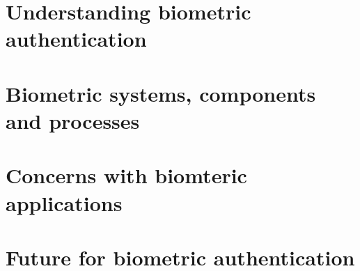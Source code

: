 \documentclass[a4paper,12pt,fleqn]{article}
\begin{document}

\tableofcontents








\newpage
\section{Understanding biometric authentication}\label{sec:definition}



\section{Biometric systems, components and processes}\label{sec:systems}


\section{Concerns with biomteric applications}\label{sec:concerns}

\section{Future for biometric authentication}\label{sec:future}








\end{document}
